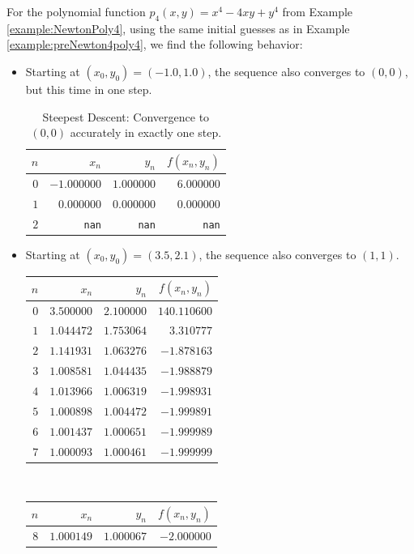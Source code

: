 \begin{example}
For the polynomial function $p_4(x,y) = x^4-4xy+y^4$ from Example \ref{example:NewtonPoly4}, using the same initial guesses as in Example \ref{example:preNewton4poly4}, we find the following behavior:
\begin{itemize}
	\item Starting at $(x_0, y_0) = (-1.0,1.0)$, the sequence also converges to $(0,0)$, but this time in one step.
	\begin{table}[ht!]
	\begin{tabular}{|r|r|r|r|} \hline 
	$n$ & $x_n$ & $y_n$ & $f(x_n,y_n)$ \\ \hline \hline 
	$0$ & $-1.000000$ & $1.000000$ & $6.000000$ \\ \hline 
	$1$ & $0.000000$ & $0.000000$ & $0.000000$ \\ \hline 
	$2$ & \texttt{nan} & \texttt{nan} & \texttt{nan} \\ \hline 
	\end{tabular}
	\caption{Steepest Descent: Convergence to $(0,0)$ accurately in exactly one step.}
	\label{table:SD00}
	\end{table}
	\item Starting at $(x_0,y_0) = (3.5, 2.1)$, the sequence also converges to $(1,1)$.
	\begin{table}[ht!]
	\begin{tabular}{|r|r|r|r|} \hline 
	$n$ & $x_n$ & $y_n$ & $f(x_n,y_n)$ \\ \hline \hline 
	$0$ & $3.500000$ & $2.100000$ & $140.110600$ \\ \hline 
	$1$ & $1.044472$ & $1.753064$ & $3.310777$ \\ \hline 
	$2$ & $1.141931$ & $1.063276$ & $-1.878163$ \\ \hline 
	$3$ & $1.008581$ & $1.044435$ & $-1.988879$ \\ \hline 
	$4$ & $1.013966$ & $1.006319$ & $-1.998931$ \\ \hline 
	$5$ & $1.000898$ & $1.004472$ & $-1.999891$ \\ \hline 
	$6$ & $1.001437$ & $1.000651$ & $-1.999989$ \\ \hline 
	$7$ & $1.000093$ & $1.000461$ & $-1.999999$ \\ \hline 
	\end{tabular}~\begin{tabular}{|r|r|r|r|} \hline 
	$n$ & $x_n$ & $y_n$ & $f(x_n,y_n)$ \\ \hline \hline 
	$8$ & $1.000149$ & $1.000067$ & $-2.000000$ \\ \hline 

\end{tabular}
\end{table}
\end{itemize}
\end{example}
